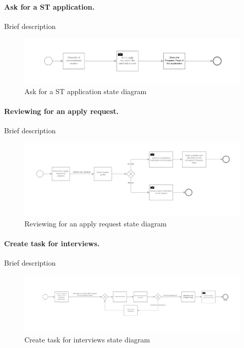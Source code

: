 \paragraph{Ask for a ST application.}
Brief description

\begin{figure}[H]
    \begin{center}
        \includegraphics[width=1\linewidth]{RASD/LaTeX/Images/StateDiagrams/ask_for_a_ST_application.png}
        \caption{Ask for a ST application state diagram}
        \label{fig:signup_sd}%
    \end{center}
\end{figure}

\paragraph{Reviewing for an apply request.}
Brief description

\begin{figure}[H]
    \begin{center}
        \includegraphics[width=1\linewidth]{RASD/LaTeX/Images/StateDiagrams/reviewing_an_apply_request.png}
        \caption{Reviewing for an apply request state diagram}
        \label{fig:signup_sd}%
    \end{center}
\end{figure}

\paragraph{Create task for interviews.}
Brief description

\begin{figure}[H]
    \begin{center}
        \includegraphics[width=1\linewidth]{RASD/LaTeX/Images/StateDiagrams/create_task_for_interviews.png}
        \caption{Create task for interviews state diagram}
        \label{fig:signup_sd}%
    \end{center}
\end{figure}

